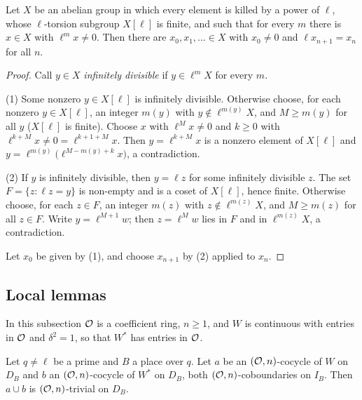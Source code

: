 \begin{lemma}\label{pf:kato:divchain}
Let $X$ be an abelian group in which every element is killed by a power of $\ell$, whose $\ell$-torsion subgroup $X[\ell]$ is finite,
and such that for every $m$ there is $x\in X$ with $\ell^mx\ne0$. Then there are $x_0,x_1,\ldots\in X$ with $x_0\ne0$ and
$\ell x_{n+1}=x_n$ for all $n$.
\end{lemma}

\begin{proof}
Call $y\in X$ \emph{infinitely divisible} if $y\in\ell^mX$ for every $m$.

(1) Some nonzero $y\in X[\ell]$ is infinitely divisible. Otherwise choose, for each nonzero $y\in X[\ell]$, an integer $m(y)$ with
$y\notin\ell^{m(y)}X$, and $M\ge m(y)$ for all $y$ ($X[\ell]$ is finite). Choose $x$ with $\ell^Mx\ne0$ and $k\ge0$ with
$\ell^{k+M}x\ne0=\ell^{k+1+M}x$. Then $y=\ell^{k+M}x$ is a nonzero element of $X[\ell]$ and $y=\ell^{m(y)}\bigl(\ell^{M-m(y)+k}x\bigr)$, a
contradiction.

(2) If $y$ is infinitely divisible, then $y=\ell z$ for some infinitely divisible $z$. The set $F=\{z:\ell z=y\}$ is non-empty and is
a coset of $X[\ell]$, hence finite. Otherwise choose, for each $z\in F$, an integer $m(z)$ with $z\notin\ell^{m(z)}X$, and $M\ge m(z)$
for all $z\in F$. Write $y=\ell^{M+1}w$; then $z=\ell^Mw$ lies in $F$ and in $\ell^{m(z)}X$, a contradiction.

Let $x_0$ be given by (1), and choose $x_{n+1}$ by (2) applied to $x_n$.
\end{proof}

\subsection{Local lemmas}\label{pf:kato:sec:local}

In this subsection $\mathcal{O}$ is a coefficient ring, $n\ge1$, and $W$ is continuous with entries in $\mathcal{O}$ and
$\delta^2=1$, so that $W^*$ has entries in $\mathcal{O}$.

\begin{lemma}\label{pf:kato:unrcup}
Let $q\ne\ell$ be a prime and $B$ a place over $q$. Let $a$ be an $(\mathcal{O},n)$-cocycle of $W$ on $D_B$ and $b$ an
$(\mathcal{O},n)$-cocycle of $W^*$ on $D_B$, both $(\mathcal{O},n)$-coboundaries on $I_B$. Then $a\cup b$ is $(\mathcal{O},n)$-trivial
on $D_B$.
\end{lemma}

